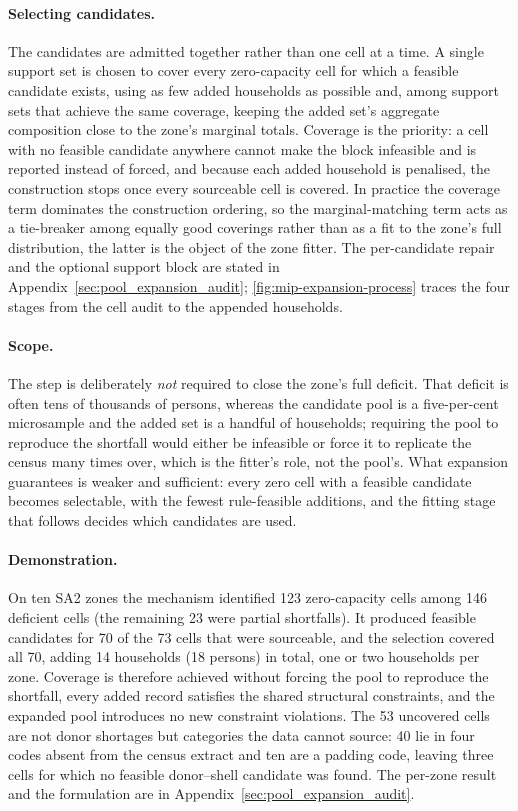 \paragraph{Selecting candidates.}
The candidates are admitted together rather than one cell at a time. A single
support set is chosen to cover every zero-capacity cell for which a feasible
candidate exists, using as few added households as possible and, among
support sets that achieve the same coverage, keeping the added set's aggregate
composition close to the zone's marginal totals. Coverage is the priority: a
cell with no feasible candidate anywhere cannot make the block infeasible and
is reported instead of forced, and because each added household is penalised, the
construction stops once every sourceable cell is covered. In practice the coverage
term dominates the construction ordering, so the marginal-matching term acts as a
tie-breaker among equally good coverings rather than as a fit to the zone's full
distribution, the latter is the object of the zone fitter. The per-candidate
repair and the optional support block are stated in
Appendix~\ref{sec:pool_expansion_audit}; \cref{fig:mip-expansion-process}
traces the four stages from the cell audit to the appended households.



\paragraph{Scope.}
The step is deliberately \emph{not} required to close the zone's full deficit.
That deficit is often tens of thousands of persons, whereas the candidate pool
is a five-per-cent microsample and the added set is a handful of households;
requiring the pool to reproduce the shortfall would either be infeasible or
force it to replicate the census many times over, which is the fitter's role,
not the pool's. What expansion guarantees is weaker and sufficient: every zero
cell with a feasible candidate becomes selectable, with the fewest rule-feasible
additions, and the fitting stage that follows decides which candidates are used.

\paragraph{Demonstration.}
On ten SA2 zones the mechanism identified 123 zero-capacity cells among 146
deficient cells (the remaining 23 were partial shortfalls). It produced feasible
candidates for 70 of the 73 cells that were sourceable, and the selection covered
all 70, adding 14 households (18 persons) in total, one or two households per
zone. Coverage is therefore achieved without forcing the pool to reproduce the
shortfall, every added record satisfies the shared structural constraints, and
the expanded pool introduces no new constraint violations. The 53 uncovered cells
are not donor shortages but categories the data cannot source: 40 lie in four
codes absent from the census extract and ten are a padding code, leaving three
cells for which no feasible donor--shell candidate was found. The per-zone result
and the formulation are in Appendix~\ref{sec:pool_expansion_audit}.

